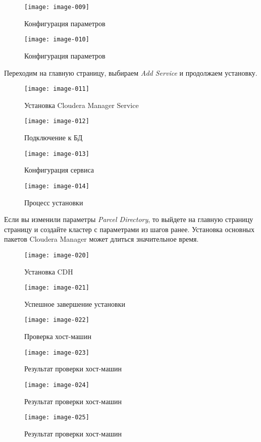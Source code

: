 \begin{figure}[ht!]
    \center
    \texttt{[image: image-009]}
    \caption{Конфигурация параметров}
    \texttt{[image: image-010]}
    \caption{Конфигурация параметров}
\end{figure}
Переходим на главную страницу, выбираем \emph{Add Service} и продолжаем установку.

\newpage

\begin{figure}[ht!]
    \center
    \texttt{[image: image-011]}
    \caption{Установка Cloudera Manager Service}
    \texttt{[image: image-012]}
    \caption{Подключение к БД}
\end{figure}

\newpage

\begin{figure}[ht!]
    \center
    \texttt{[image: image-013]}
    \caption{Конфигурация сервиса}
    \texttt{[image: image-014]}
    \caption{Процесс установки}
\end{figure}

Если вы изменили параметры \emph{Parcel Directory}, то выйдете на главную страницу страницу и 
создайте кластер с параметрами из шагов ранее. Установка основных пакетов Cloudera Manager 
может длиться значительное время.

\newpage

\begin{figure}[ht!]
    \center
    \texttt{[image: image-020]}
    \caption{Установка CDH}
    \texttt{[image: image-021]}
    \caption{Успешное завершение установки}
\end{figure}

\newpage

\begin{figure}[ht!]
    \center
    \texttt{[image: image-022]}
    \caption{Проверка хост-машин}
    \texttt{[image: image-023]}
    \caption{Результат проверки хост-машин}
\end{figure}

\newpage

\begin{figure}[ht!]
    \center
    \texttt{[image: image-024]}
    \caption{Результат проверки хост-машин}
    \texttt{[image: image-025]}
    \caption{Результат проверки хост-машин}
\end{figure}

